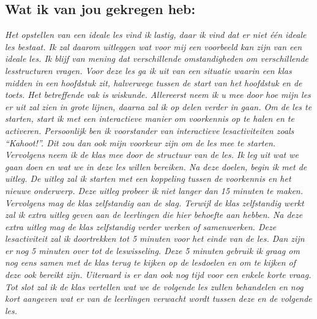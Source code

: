 \documentclass{article}
\begin{document}
        \subsection{Wat ik van jou gekregen heb:}
            {\itshape             
                Het opstellen van een ideale les vind ik lastig, daar ik vind dat er niet één ideale les bestaat. Ik zal daarom uitleggen wat voor mij een voorbeeld kan zijn van een ideale les. Ik blijf van mening dat verschillende omstandigheden om verschillende lesstructuren vragen.
                Voor deze les ga ik uit van een situatie waarin een klas midden in een hoofdstuk zit, halverwege tussen de start van het hoofdstuk en de toets. Het betreffende vak is wiskunde.
                Allereerst neem ik u mee door hoe mijn les er uit zal zien in grote lijnen, daarna zal ik op delen verder in gaan.
                Om de les te starten, start ik met een interactieve manier om voorkennis op te halen en te activeren. Persoonlijk ben ik voorstander van interactieve lesactiviteiten zoals “Kahoot!”. Dit zou dan ook mijn voorkeur zijn om de les mee te starten. 
                Vervolgens neem ik de klas mee door de structuur van de les. Ik leg uit wat we gaan doen en wat we in deze les willen bereiken.
                Na deze doelen, begin ik met de uitleg. De uitleg zal ik starten met een koppeling tussen de voorkennis en het nieuwe onderwerp. Deze uitleg probeer ik niet langer dan 15 minuten te maken.
                Vervolgens mag de klas zelfstandig aan de slag. Terwijl de klas zelfstandig werkt zal ik extra uitleg geven aan de leerlingen die hier behoefte aan hebben. Na deze extra uitleg mag de klas zelfstandig verder werken of samenwerken. Deze lesactiviteit zal ik doortrekken tot 5 minuten voor het einde van de les.
                Dan zijn er nog 5 minuten over tot de leswisseling. Deze 5 minuten gebruik ik graag om nog eens samen met de klas terug te kijken op de lesdoelen en om te kijken of deze ook bereikt zijn. Uiteraard is er dan ook nog tijd voor een enkele korte vraag. Tot slot zal ik de klas vertellen wat we de volgende les zullen behandelen en nog kort aangeven wat er van de leerlingen verwacht wordt tussen deze en de volgende les.
                
}
\end{document}
